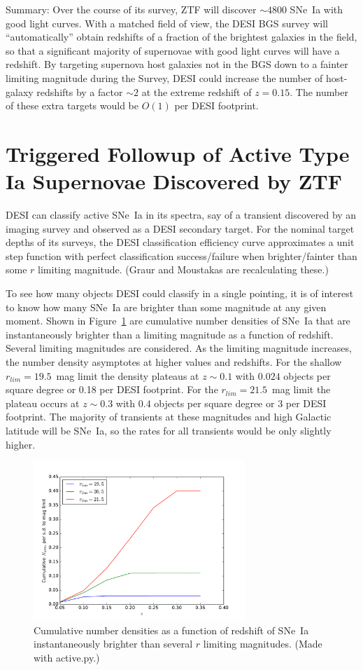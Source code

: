 \documentclass{article}   	%
\begin{document}
Summary: Over the course of its survey, ZTF will discover 
\color{red}
$\sim 4800$
\color{black}
SNe~Ia with good light curves.  With a matched field of view,
the DESI BGS survey will ``automatically'' obtain redshifts of a fraction of the brightest galaxies in the field, so that a significant majority
of supernovae with good light curves will have a redshift.   By targeting supernova host galaxies not in the BGS down to a fainter limiting magnitude
during the Survey,
DESI could increase the number of host-galaxy redshifts by a factor $\sim 2$ at the extreme redshift of $z=0.15$.  The number of these
extra targets would be
\color{red}
$O(1)$
\color{black}
per DESI footprint.

\section{Triggered Followup of Active Type Ia Supernovae Discovered by ZTF}
DESI can classify active SNe~Ia in its spectra, say of
a transient discovered by an imaging survey and  observed as a DESI secondary target.
For the nominal target depths of its surveys, the DESI classification efficiency curve approximates 
a unit step function with perfect classification success/failure when brighter/fainter than some $r$ limiting magnitude.  (Graur and Moustakas are recalculating these.)

To see how many objects DESI could classify in a single pointing, 
it is of interest to know how many SNe~Ia are brighter than some magnitude at any given moment.
Shown in Figure~\ref{cum:fig} are cumulative number densities of SNe~Ia that are instantaneously brighter than a limiting magnitude as a function of redshift.
Several limiting magnitudes are considered. 
As the limiting magnitude increases, the number density asymptotes at higher values and redshifts.
\color{red}
For the shallow $r_{lim}=19.5$~mag limit the density plateaus at $z \sim 0.1$ with $0.024$ objects per square degree or 0.18 per DESI footprint.   For the $r_{lim}=21.5$~mag limit the plateau occurs at $z \sim 0.3$ with $0.4$ objects per square degree or 3 per DESI footprint. 
\color{black}
The majority of transients at these magnitudes and high Galactic latitude will be SNe~Ia, so the rates for all transients would be only slightly higher.

\begin{figure}[h]
\includegraphics[width=8cm]{../src/cumulative.pdf}
\centering
\caption{Cumulative number densities as a function of redshift of SNe~Ia instantaneously brighter than several $r$ limiting magnitudes.
(Made with active.py.)
\label{cum:fig}}
\end{figure}
\end{document}
